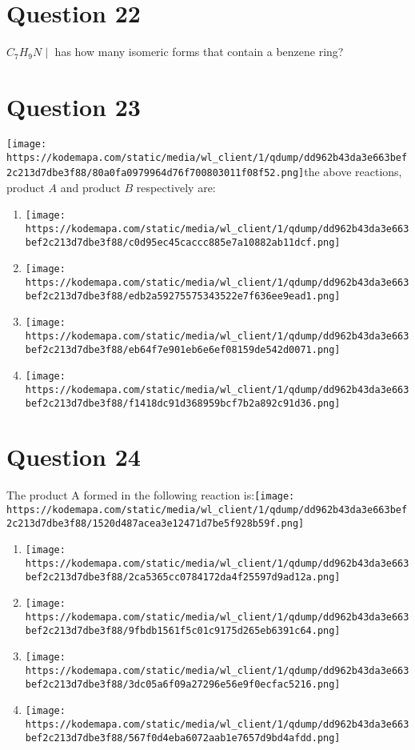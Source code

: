 \documentclass{article}
\begin{document}
\section*{Question 22}
\(C_7 H_9 N \mid\) has how many isomeric forms that contain a benzene ring? 
\begin{enumerate}[label=(\alph*)]
\end{enumerate}
\newpage
\section*{Question 23}
\texttt{[image: https://kodemapa.com/static/media/wl\_client/1/qdump/dd962b43da3e663bef2c213d7dbe3f88/80a0fa0979964d76f700803011f08f52.png]}\newlineIn the above reactions, product \(A\) and product \(B\) respectively are:
\begin{enumerate}[label=(\alph*)]
\item \texttt{[image: https://kodemapa.com/static/media/wl\_client/1/qdump/dd962b43da3e663bef2c213d7dbe3f88/c0d95ec45caccc885e7a10882ab11dcf.png]}
\item \texttt{[image: https://kodemapa.com/static/media/wl\_client/1/qdump/dd962b43da3e663bef2c213d7dbe3f88/edb2a59275575343522e7f636ee9ead1.png]}
\item \texttt{[image: https://kodemapa.com/static/media/wl\_client/1/qdump/dd962b43da3e663bef2c213d7dbe3f88/eb64f7e901eb6e6ef08159de542d0071.png]}
\item \texttt{[image: https://kodemapa.com/static/media/wl\_client/1/qdump/dd962b43da3e663bef2c213d7dbe3f88/f1418dc91d368959bcf7b2a892c91d36.png]}
\end{enumerate}
\newpage
\section*{Question 24}
The product A formed in the following reaction is:\texttt{[image: https://kodemapa.com/static/media/wl\_client/1/qdump/dd962b43da3e663bef2c213d7dbe3f88/1520d487acea3e12471d7be5f928b59f.png]}\newline\newline
\begin{enumerate}[label=(\alph*)]
\item \texttt{[image: https://kodemapa.com/static/media/wl\_client/1/qdump/dd962b43da3e663bef2c213d7dbe3f88/2ca5365cc0784172da4f25597d9ad12a.png]}
\item \texttt{[image: https://kodemapa.com/static/media/wl\_client/1/qdump/dd962b43da3e663bef2c213d7dbe3f88/9fbdb1561f5c01c9175d265eb6391c64.png]}
\item \texttt{[image: https://kodemapa.com/static/media/wl\_client/1/qdump/dd962b43da3e663bef2c213d7dbe3f88/3dc05a6f09a27296e56e9f0ecfac5216.png]}
\item \texttt{[image: https://kodemapa.com/static/media/wl\_client/1/qdump/dd962b43da3e663bef2c213d7dbe3f88/567f0d4eba6072aab1e7657d9bd4afdd.png]}
\end{enumerate}
\newpage
\end{document}

